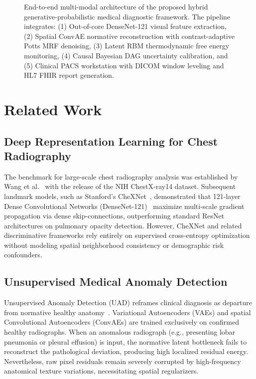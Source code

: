 \documentclass[conference]{IEEEtran}
\begin{document}
\begin{figure}[!t]
{%
}
\caption{End-to-end multi-modal architecture of the proposed hybrid generative-probabilistic medical diagnostic framework. The pipeline integrates: (1) Out-of-core DenseNet-121 visual feature extraction, (2) Spatial ConvAE normative reconstruction with contrast-adaptive Potts MRF denoising, (3) Latent RBM thermodynamic free energy monitoring, (4) Causal Bayesian DAG uncertainty calibration, and (5) Clinical PACS workstation with DICOM window leveling and HL7 FHIR report generation.}
\label{fig:pipeline_architecture}
\end{figure}

\section{Related Work}

\subsection{Deep Representation Learning for Chest Radiography}
The benchmark for large-scale chest radiography analysis was established by Wang et al.~\cite{wang2017chestxray} with the release of the NIH ChestX-ray14 dataset. Subsequent landmark models, such as Stanford's CheXNet~\cite{rajpurkar2017chexnet}, demonstrated that 121-layer Dense Convolutional Networks (DenseNet-121)~\cite{huang2017densely} maximize multi-scale gradient propagation via dense skip-connections, outperforming standard ResNet architectures on pulmonary opacity detection. However, CheXNet and related discriminative frameworks rely entirely on supervised cross-entropy optimization without modeling spatial neighborhood consistency or demographic risk confounders.

\subsection{Unsupervised Medical Anomaly Detection}
Unsupervised Anomaly Detection (UAD) reframes clinical diagnosis as departure from normative healthy anatomy~\cite{schlegl2019f, baur2021autoencoders}. Variational Autoencoders (VAEs) and spatial Convolutional Autoencoders (ConvAEs) are trained exclusively on confirmed healthy radiographs. When an anomalous radiograph (e.g., presenting lobar pneumonia or pleural effusion) is input, the normative latent bottleneck fails to reconstruct the pathological deviation, producing high localized residual energy. Nevertheless, raw pixel residuals remain severely corrupted by high-frequency anatomical texture variations, necessitating spatial regularizers.
\end{document}
